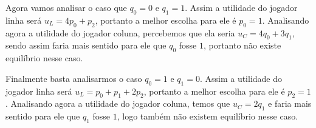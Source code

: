 \documentclass[12pt, letterpaper]{article}
\begin{document}
	Agora vamos analisar o caso que $q_0 = 0$ e $q_1 = 1$. Assim a utilidade do jogador linha será $u_L = 4p_0 + p_2$, portanto a melhor escolha para ele é $p_0 = 1$. Analisando agora a utilidade do jogador coluna, percebemos que ela seria $u_C = 4q_0 + 3q_1$, sendo assim faria mais sentido para ele que $q_0$ fosse $1$, portanto não existe equilíbrio nesse caso.

	Finalmente basta analisarmos o caso $q_0 = 1$ e $q_1 = 0$. Assim a utilidade do jogador linha será $u_L = p_0 + p_1 + 2p_2$, portanto a melhor escolha para ele é $p_2 = 1$. Analisando agora a utilidade do jogador coluna, temos que $u_C = 2q_1$ e faria mais sentido para ele que $q_1$ fosse $1$, logo também não existem equilíbrio nesse caso.
\end{document}
